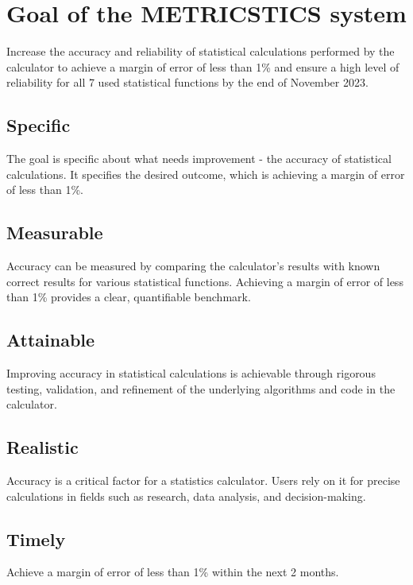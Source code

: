 \section{Goal of the METRICSTICS system}


Increase the accuracy and reliability of statistical calculations performed by the calculator to achieve a margin of error of less than 1\% and ensure a high level of reliability for all 7 used statistical functions by the end of November 2023.
 
\subsection*{Specific}
The goal is specific about what needs improvement - the accuracy of statistical calculations. It specifies the desired outcome, which is achieving a margin of error of less than 1\%.

\subsection*{Measurable}
Accuracy can be measured by comparing the calculator's results with known correct results for various statistical functions. Achieving a margin of error of less than 1\% provides a clear, quantifiable benchmark.

\subsection*{Attainable}
Improving accuracy in statistical calculations is achievable through rigorous testing, validation, and refinement of the underlying algorithms and code in the calculator.

\subsection*{Realistic}
Accuracy is a critical factor for a statistics calculator. Users rely on it for precise calculations in fields such as research, data analysis, and decision-making.

\subsection*{Timely}
Achieve a margin of error of less than 1\% within the next 2 months.
\hfill \break
\hfill \break


